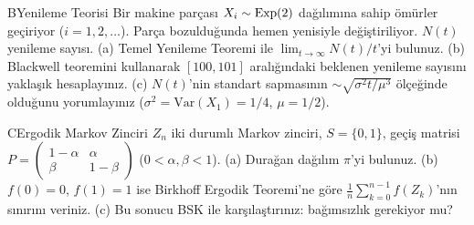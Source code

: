 \begin{alistirma}[Al.7.11]{B}{Yenileme Teorisi}
Bir makine parçası $X_i \sim \operatorname{Exp}(2)$ dağılımına sahip ömürler geçiriyor ($i = 1, 2, \ldots$).
Parça bozulduğunda hemen yenisiyle değiştiriliyor. $N(t)$ yenileme sayısı.
(a) Temel Yenileme Teoremi ile $\lim_{t\to\infty} N(t)/t$'yi bulunuz.
(b) Blackwell teoremini kullanarak $[100, 101]$ aralığındaki beklenen yenileme sayısını yaklaşık hesaplayınız.
(c) $N(t)$'nin standart sapmasının $\sim \sqrt{\sigma^2 t/\mu^3}$ ölçeğinde olduğunu yorumlayınız
    ($\sigma^2 = \mathrm{Var}(X_1) = 1/4$, $\mu = 1/2$).
\end{alistirma}

\begin{alistirma}[Al.7.12]{C}{Ergodik Markov Zinciri}
$Z_n$ iki durumlı Markov zinciri, $S = \{0, 1\}$, geçiş matrisi
$P = \begin{pmatrix}1-\alpha & \alpha \\ \beta & 1-\beta\end{pmatrix}$
($0 < \alpha, \beta < 1$).
(a) Durağan dağılım $\pi$'yi bulunuz.
(b) $f(0) = 0$, $f(1) = 1$ ise Birkhoff Ergodik Teoremi'ne göre
    $\frac{1}{n}\sum_{k=0}^{n-1} f(Z_k)$'nın sınırını veriniz.
(c) Bu sonucu BSK ile karşılaştırınız: bağımsızlık gerekiyor mu?
\end{alistirma}

\endinput
